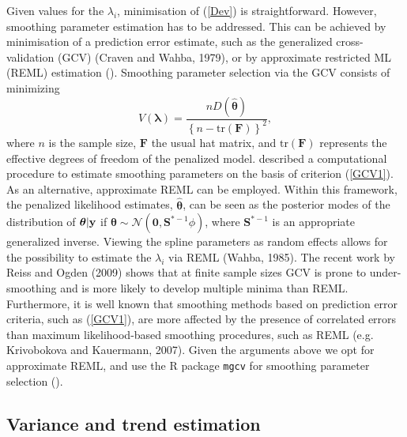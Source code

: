 Given values for the $\lambda_i$, minimisation of (\ref{Dev}) is straightforward. However, smoothing parameter estimation has to be addressed. This can be achieved by minimisation of a prediction error estimate, such as the generalized cross-validation (GCV) (Craven and Wahba, 1979), or by approximate restricted ML (REML) estimation (\cite{remlpaper}). Smoothing parameter selection via the GCV consists of minimizing 
\begin{equation}
V(\bm\lambda)=\frac{nD(\hat{\bm\theta})}{\left\{n-\text{tr}(\textbf{F})\right\}^2},
\label{GCV1}
\end{equation}
where $n$ is the sample size, $\textbf{F}$ the usual hat matrix, and $\text{tr}(\textbf{F})$ represents the effective degrees of freedom of the penalized model.  described a computational procedure to estimate smoothing parameters on the basis of criterion (\ref{GCV1}). As an alternative, approximate REML can be employed. Within this framework, the penalized likelihood estimates, $\hat{\bm\theta}$, can be seen as the posterior modes of the distribution of $\bm\theta|{\bf y}$ if $\bm\theta \sim \mathcal{N}(\textbf{0},\textbf{S}^{*-1}\phi)$, where $\textbf{S}^{*-1}$ is an appropriate generalized inverse. Viewing the spline parameters as random effects allows for the possibility to estimate the $\lambda_i$ via REML (Wahba, 1985). The recent work by Reiss and Ogden (2009) shows that at finite sample sizes GCV is prone to under-smoothing and is more likely to develop multiple minima than REML. Furthermore, it is well known that smoothing methods based on prediction error criteria, such as (\ref{GCV1}), are more affected by the presence of correlated errors than maximum likelihood-based smoothing procedures, such as REML (e.g. Krivobokova and Kauermann, 2007). Given the arguments above we opt for approximate REML, and use the \textsf{R} package \texttt{mgcv} for smoothing parameter selection (\cite{remlpaper}). 

\subsection{Variance and trend estimation \label{VE}}

